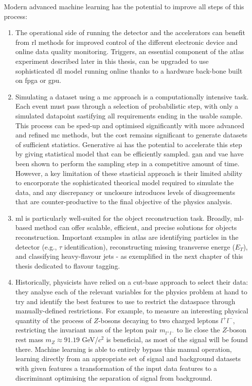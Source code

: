 Modern advanced machine learning has the potential to improve all steps of this process:
\begin{enumerate}
    \item The operational side of running the detector and the accelerators can benefit from \gls{rl} methods for improved control of the different electronic device and online data quality monitoring. Triggers, an essential component of the \gls{atlas} experiment described later in this thesis, can be upgraded to use sophisticated \gls{dl} model running online thanks to a hardware back-bone built on \gls{fpga} or \gls{gpu}.
    \item Simulating a dataset using a \gls{mc} approach is a computationally intensive task. Each event must pass through a selection of probabilistic step, with only a simulated datapoint sastifying all requirements ending in the usable sample. This process can be sped-up and optimised significantly with more advanced and refined \gls{mc} methods, but the cost remains significant to generate datasets of sufficient statistics. Generative \gls{ai} has the potential to accelerate this step by giving statistical model that can be efficiently sampled. \gls{gan} and \gls{vae} have been shown to perform the sampling step in a competitive amount of time. However, a key limitation of these stasticial approach is their limited ability to encorporate the sophisticated theorical model required to simulate the data, and any discrepancy or unclosure introduces levels of disagreements that are counter-productive to the final objective of the physics analysis.
    \item \gls{ml} is particularly well-suited for the object reconstruction task. Broadly, \gls{ml}-based method can offer scalable, efficient, and precise solutions for objects reconstruction. Important examples in \gls{atlas} are identifying particles in the detector (e.g., $\tau$ identification), reconstructing missing transverse energe ($E_T$), and classifying heavy-flavour jets - as exemplified in the next chapter of this thesis dedicated to flavour tagging. %
    \item Historically, physicists have relied on a cut-base approach to select their data: they analyse each of the relevant variables for the physics problem at hand to try and identify the best features to use to restrict the dataspace through manually-defined restrictions. For example, to measure an interesting physical quantity of the process of $Z$-bosons decaying to two charged leptons $l^+l^-$, restricting the invariant mass of the lepton pair $m_{l^+l^-}$ to lie close the $Z$-boson rest mass $m_Z \approx 91.19$ GeV/$c^2$ is beneficial, as most of the signal will be found there. Machine learning is able to entirely bypass this manual operation, learning directly from an appropriate set of signal and background datasets with given features a transformation of the input data features to a discriminant optimising the separation of signal from background. 

\end{enumerate}
